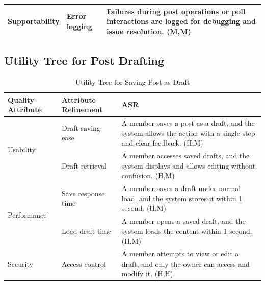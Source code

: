 \documentclass{article}
\begin{document}
\begin{table}[H]
\begin{tabular}{|p{3cm}|p{4cm}|p{7cm}|}
        Supportability
                                   & Error logging
                                   & Failures during post operations or poll interactions are logged for debugging and issue resolution. (M,M)                                                           \\
        \hline
    \end{tabular}
\end{table}

\subsection{Utility Tree for Post Drafting}

\begin{table}[H]
    \centering
    \caption{Utility Tree for Saving Post as Draft}
    \begin{tabular}{|p{3cm}|p{4cm}|p{7cm}|}
        \hline
        \textbf{Quality Attribute} & \textbf{Attribute Refinement}                                                                                      & \textbf{ASR} \\
        \hline

        \multirow{2}{*}{Usability}
                                   & Draft saving ease
                                   & A member saves a post as a draft, and the system allows the action with a single step and clear feedback. (H,M)                   \\
        \cline{2-3}
                                   & Draft retrieval
                                   & A member accesses saved drafts, and the system displays and allows editing without confusion. (H,M)                               \\
        \hline

        \multirow{2}{*}{Performance}
                                   & Save response time
                                   & A member saves a draft under normal load, and the system stores it within 1 second. (H,M)                                         \\
        \cline{2-3}
                                   & Load draft time
                                   & A member opens a saved draft, and the system loads the content within 1 second. (H,M)                                             \\
        \hline

        Security
                                   & Access control
                                   & A member attempts to view or edit a draft, and only the owner can access and modify it. (H,H)                                     \\
        \hline


\end{tabular}
\end{table}
\end{document}
